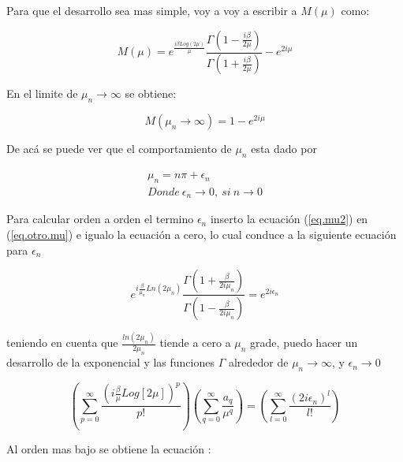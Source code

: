 Para que el desarrollo sea mas simple, voy a voy a escribir a $M (\mu)$ como:

\begin{equation}
M (\mu) = e ^{\frac{i \beta Log(2 \mu)}{\mu}}
\frac{\Gamma (1- \frac{i \beta}{2 \mu})}{\Gamma (1 + \frac{i \beta}{2 \mu})}
- e ^{2 i \mu}
\label{eq.otro.mu}
\end{equation}


En el limite de $\mu _n \rightarrow \infty$ se obtiene:

\begin{equation}
    M(\mu _n \rightarrow \infty) = 
	1 - e ^{2 i \mu}
\end{equation}

De acá se puede ver que el comportamiento de $\mu _n$ esta dado por 


\begin{equation}
\begin{array}{c}
    \mu _n = n \pi + \epsilon _n \\
    Donde \ \epsilon _n \rightarrow{0} ,\ si \ n \rightarrow{0}
\end{array}
\label{eq.mu2}
\end{equation}



Para calcular orden a orden el termino $\epsilon _n$ inserto la ecuación (\ref{eq.mu2}) en (\ref{eq.otro.mu}) e igualo la ecuación a cero, lo cual conduce a la siguiente ecuación para $\epsilon _n$

\begin{equation}
	e ^{ i \frac{\beta}{ \mu _n} Ln(2 \mu _n)}     
    \frac{\Gamma(1 + \frac{ \beta}{2 i \mu _n} ) }
    {\Gamma(1 - \frac{ \beta}{2 i \mu _n})} =    
    e ^{2 i \epsilon _n }
\end{equation}

teniendo en cuenta que $\frac{ln(2 \mu _n)}{2 \mu _n }$ tiende a cero a $\mu _n$ grade, puedo hacer un desarrollo de la exponencial y las funciones $\Gamma$ alrededor de $ \mu _n \rightarrow \infty $, y $\epsilon _n \rightarrow 0$

\begin{equation}
    \left(
    \sum _{p = 0} ^{\infty} \frac{ \left( i \frac{\beta}{ \mu} Log[2 \mu] \right) ^p }{p!}
    \right)
    \left(
	\sum _{q = 0} ^{\infty} \frac{a _q}{\mu ^q}
	\right)
    =
    \left(
    \sum _{l = 0} ^{\infty} \frac{( 2 i \epsilon _n)^l}{l !}
    \right)
\end{equation}


Al orden mas bajo se obtiene la ecuación : 

